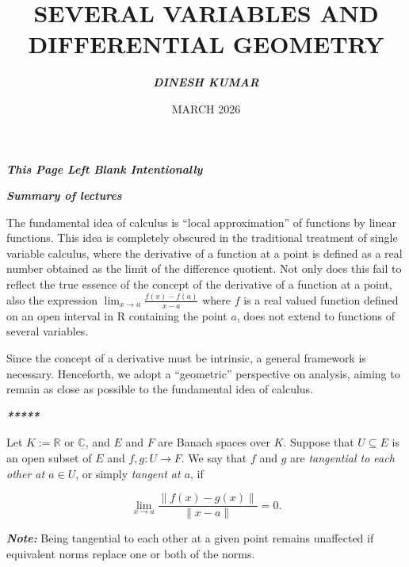 \documentclass{book}
\title{\textbf{SEVERAL VARIABLES AND DIFFERENTIAL GEOMETRY }}
\author{\textbf{\textit{DINESH KUMAR}}}
\date{ MARCH 2026}
\begin{document}
\maketitle
\newpage
\thispagestyle{empty}

\begin{center}
\vspace*{\fill}
\textbf{\textit{This Page Left Blank Intentionally}}
\vspace*{\fill}
\end{center}

\newpage
\begin{center}
{\LARGE \textbf{\textit{Summary of lectures}}}
\end{center}

\vspace{1cm}

The fundamental idea of calculus is ``local approximation'' of functions by linear functions. This idea is completely obscured in the traditional treatment of single variable calculus, where the derivative of a function at a point is defined as a real number obtained as the limit of the difference quotient. Not only does this fail to reflect the true essence of the concept of the derivative of a function at a point, also the expression $\lim_{x \to a} \frac{f(x)-f(a)}{x-a}$ where $f$ is a real valued function defined on an open interval in R containing the point $a$, does not extend to functions of several variables.

\vspace{1cm}

Since the concept of a derivative must be intrinsic, a general framework is necessary. Henceforth, we adopt a ``geometric'' perspective on analysis, aiming to remain as close as possible to the fundamental idea of calculus.


\begin{center}
{\LARGE \textbf{\textit{*****}}}
\end{center}
Let $K := \mathbb{R}$ or $\mathbb{C}$, and $E$ and $F$ are Banach spaces over $K$. Suppose that $U \subseteq E$ is an open subset of $E$ and $f, g : U \to F$. We say that $f$ and $g$ are \textit{tangential to each other at $a \in U$}, or simply \textit{tangent at $a$}, if

\[
\lim_{x \to a} \frac{\|f(x) - g(x)\|}{\|x - a\|} = 0.
\]

\textit{\textbf{Note:}} Being tangential to each other at a given point remains unaffected if equivalent norms replace one or both of the norms.
\end{document}
